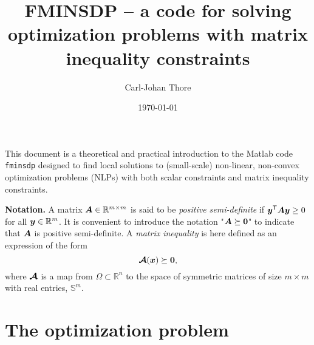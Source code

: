 \documentclass{article}
\title{FMINSDP -- a code for solving optimization problems with matrix inequality constraints}
\date{\today}
\author{Carl-Johan Thore}
\newcommand{\bm}[1]{\mbox{\boldmath $#1$}}
\newcommand{\T}{\textsf{T}}
\begin{document}
\maketitle

\thispagestyle{empty}

\noindent This document is a theoretical and practical introduction to the Matlab code \texttt{fminsdp} designed to find local solutions to (small-scale) non-linear, non-convex optimization problems (NLPs) with both scalar constraints and matrix inequality constraints. 
\vskip 2mm

\noindent \textbf{Notation.} A matrix $\bm{A} \in \mathbb{R}^{m \times m}$ is said to be \textit{positive semi-definite} if 
$\bm{y}^{\T}\bm{A}\bm{y} \geq 0$ for all $\bm{y} \in \mathbb{R}^{m}$. It is convenient to introduce
the notation "$\bm{A} \succeq \bm{0}$" to indicate that $\bm{A}$ is positive semi-definite. A \textit{matrix inequality} is here
defined as an expression of the form
\begin{equation}\label{eq:matrix_ineq}
\bm{\mathcal{A}}(\bm{x}) \succeq \bm{0},
\end{equation}
where $\bm{\mathcal{A}}$ is a map from $\Omega \subset \mathbb{R}^{n}$ to the space of symmetric matrices of size
$m \times m$ with real entries, $\mathbb{S}^{m}$.




\section{The optimization problem}
\end{document}
